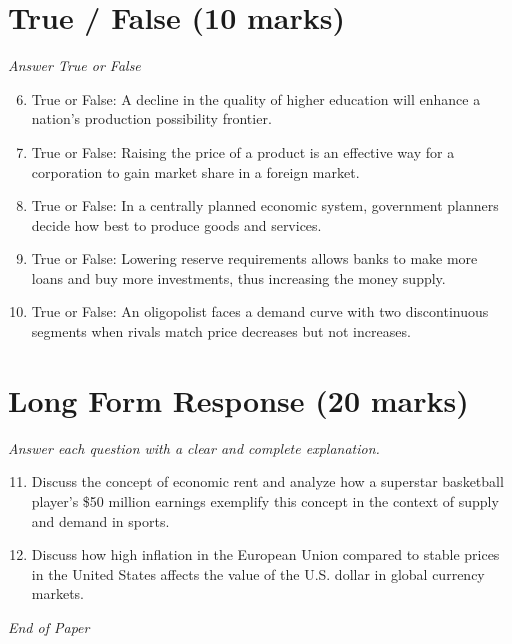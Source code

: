 \documentclass[12pt]{article}
\begin{document}
\section*{True / False (10 marks)}
\textit{Answer True or False}
\begin{enumerate}[label=\arabic*.]
\setcounter{enumi}{5}
\item True or False: A decline in the quality of higher education will enhance a nation's production possibility frontier.
\item True or False: Raising the price of a product is an effective way for a corporation to gain market share in a foreign market.
\item True or False: In a centrally planned economic system, government planners decide how best to produce goods and services.
\item True or False: Lowering reserve requirements allows banks to make more loans and buy more investments, thus increasing the money supply.
\item True or False: An oligopolist faces a demand curve with two discontinuous segments when rivals match price decreases but not increases.
\end{enumerate}

\section*{Long Form Response (20 marks)}
\textit{Answer each question with a clear and complete explanation.}
\begin{enumerate}[label=\arabic*.]
\setcounter{enumi}{10}
\item Discuss the concept of economic rent and analyze how a superstar basketball player's \$50 million earnings exemplify this concept in the context of supply and demand in sports.
\item Discuss how high inflation in the European Union compared to stable prices in the United States affects the value of the U.S. dollar in global currency markets.
\end{enumerate}

\vfill
\noindent\textit{End of Paper}
\end{document}
